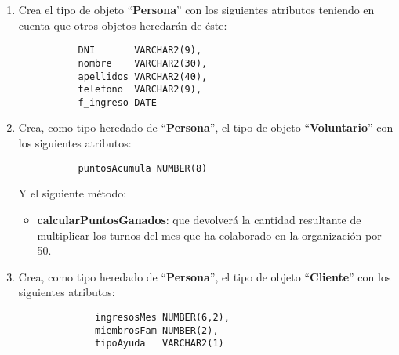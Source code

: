 \begin{enumerate}[label=\alph*)]
    \item Crea el tipo de objeto ``\textbf{Persona}'' con los siguientes atributos teniendo en cuenta que otros objetos heredarán de éste:

 \begin{figure}[H]
     \begin{tcolorbox}[sharp corners, colback=yellow!30, colframe=white!20]
         \scriptsize
         \begin{verbatim}
     DNI       VARCHAR2(9),
     nombre    VARCHAR2(30),
     apellidos VARCHAR2(40),
     telefono  VARCHAR2(9),
     f_ingreso DATE\end{verbatim}
     \end{tcolorbox}
 \end{figure}

 \item  Crea, como tipo heredado de ``\textbf{Persona}'', el tipo de objeto ``\textbf{Voluntario}'' con los siguientes atributos:

  \begin{figure}[H]
     \begin{tcolorbox}[sharp corners, colback=yellow!30, colframe=white!20]
         \scriptsize
         \begin{verbatim}
     puntosAcumula NUMBER(8)\end{verbatim}
     \end{tcolorbox}
 \end{figure}

    Y el siguiente método:

    \begin{itemize}
        \item \textbf{calcularPuntosGanados}: que devolverá la cantidad resultante de multiplicar los turnos del mes que ha colaborado en la organización por 50.
    \end{itemize}

    \item Crea, como tipo heredado de ``\textbf{Persona}'', el tipo de objeto ``\textbf{Cliente}'' con los siguientes atributos:

 \begin{figure}[H]
    \begin{tcolorbox}[sharp corners, colback=yellow!30, colframe=white!20]
        \scriptsize
        \begin{verbatim}
        ingresosMes NUMBER(6,2),
        miembrosFam NUMBER(2),
        tipoAyuda   VARCHAR2(1)\end{verbatim}
    \end{tcolorbox}
\end{figure}


\end{enumerate}
